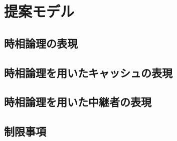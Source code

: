 \documentclass[12pt,a4paper]{jbook}
\begin{document}
\chapter{提案モデル}
\section{時相論理の表現}
\section{時相論理を用いたキャッシュの表現}
\section{時相論理を用いた中継者の表現}
\section{制限事項}
\end{document}
